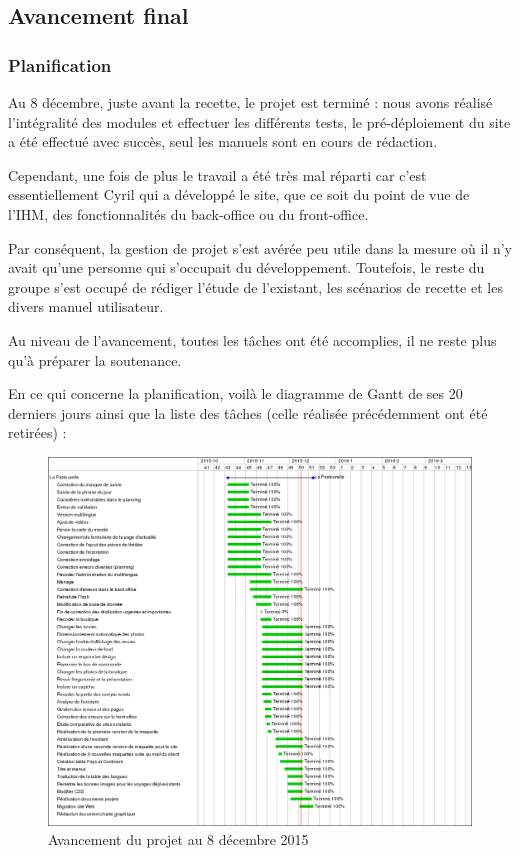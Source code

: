 \documentclass[11pt]{report}
\begin{document}
\subsection{Avancement final}
\subsubsection*{Planification}
\par Au 8 décembre, juste avant la recette, le projet est terminé : nous
avons réalisé l'intégralité des modules et effectuer les différents tests, le 
pré-déploiement du site a été effectué avec succès, seul les manuels sont en 
cours de rédaction. \\
\par Cependant, une fois de plus le travail a été très mal réparti car c'est
essentiellement Cyril qui a développé le site, que ce soit du point de vue de
l'IHM, des fonctionnalités du back-office ou du front-office. \\
\par Par conséquent, la gestion de projet s'est avérée peu utile dans la mesure
où il n'y avait qu'une personne qui s'occupait du développement. Toutefois, le
reste du groupe s'est occupé de rédiger l'étude de l'existant, les scénarios de
recette et les divers manuel utilisateur.\\
\par Au niveau de l'avancement, toutes les tâches ont été accomplies, il ne 
reste plus qu'à préparer la soutenance. \\
\par En ce qui concerne la planification, voilà le diagramme de Gantt de ses 20
derniers jours ainsi que la liste des tâches (celle réalisée précédemment ont
été retirées) :


\begin{landscape}
\begin{figure}[t]
    \caption{Avancement du projet au 8 décembre 2015}
\includegraphics[scale=0.5]{include/gantt8-12.png}
\end{figure}
\end{landscape}
\end{document}
